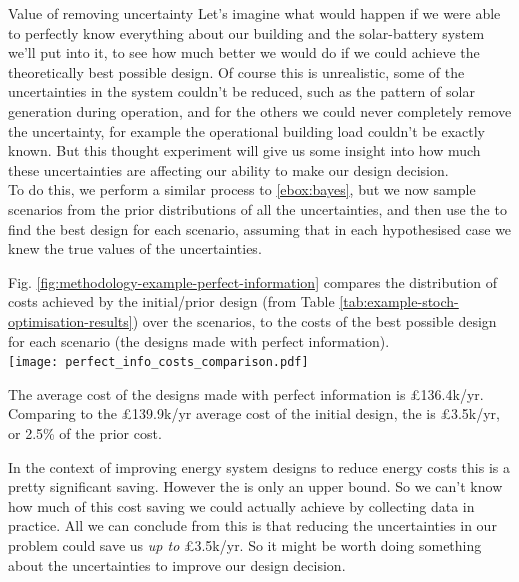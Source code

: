 \begin{ebox}{Value of removing uncertainty}
    Let's imagine what would happen if we were able to perfectly know everything about our building and the solar-battery system we'll put into it, to see how much better we would do if we could achieve the theoretically best possible design. Of course this is unrealistic, some of the uncertainties in the system couldn't be reduced, such as the pattern of solar generation during operation, and for the others we could never completely remove the uncertainty, for example the operational building load couldn't be exactly known. But this thought experiment will give us some insight into how much these uncertainties are affecting our ability to make our design decision.\\

    To do this, we perform a similar process to \ref{ebox:bayes}, but we now sample scenarios from the prior distributions of all the uncertainties, and then use the  to find the best design for each scenario, assuming that in each hypothesised case we knew the true values of the uncertainties.

    Fig. \ref{fig:methodology-example-perfect-information} compares the distribution of costs achieved by the initial/prior design (from Table \ref{tab:example-stoch-optimisation-results}) over the scenarios, to the costs of the best possible design for each scenario (the designs made with perfect information).\\

    {
        \centering
        \texttt{[image: perfect\_info\_costs\_comparison.pdf]}
        \vspace*{-0.25cm}
        \label{fig:methodology-example-perfect-information}
    }
    \bigskip

    The average cost of the designs made with perfect information is £136.4k/yr. Comparing to the £139.9k/yr average cost of the initial design, the  is £3.5k/yr, or 2.5\% of the prior cost.

    In the context of improving energy system designs to reduce energy costs this is a pretty significant saving. However the  is only an upper bound. So we can't know how much of this cost saving we could actually achieve by collecting data in practice. All we can conclude from this is that reducing the uncertainties in our problem could save us \textit{up to} £3.5k/yr. So it might be worth doing something about the uncertainties to improve our design decision.
\end{ebox}
\vspace{0.1cm}

